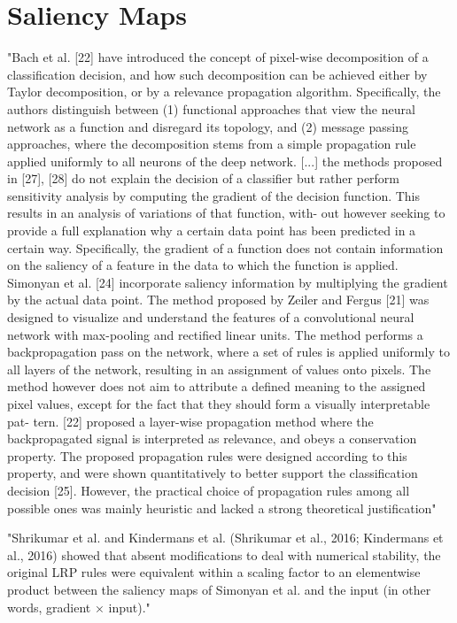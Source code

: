 \documentclass[]{scrartcl}
\begin{document}
\section{Saliency Maps}
"Bach et al. [22] have introduced the concept of pixel-wise decomposition of a classification decision, and how such decomposition can be achieved either by Taylor decomposition, or by a relevance propagation algorithm. Specifically, the authors distinguish between (1) functional approaches that view the neural network as a function and disregard its topology, and (2) message passing approaches, where the decomposition stems from a simple propagation rule applied uniformly to all neurons of the deep network.
[...]
the methods proposed in [27], [28] do not explain the decision of a classifier but rather perform sensitivity analysis by computing the gradient of the decision function. This results in an analysis of variations of that function, with- out however seeking to provide a full explanation why a certain data point has been predicted in a certain way. Specifically, the gradient of a function does not contain information on the saliency of a feature in the data to which the function is applied. Simonyan et al. [24] incorporate saliency information by multiplying the gradient by the actual data point.
The method proposed by Zeiler and Fergus [21] was designed to visualize and understand the features of a convolutional neural network with max-pooling and rectified linear units. The method performs a backpropagation pass on the network, where a set of rules is applied uniformly to all layers of the network, resulting in an assignment of values onto pixels. The method however does not aim to attribute a defined meaning to the assigned pixel values, except for the fact that they should form a visually interpretable pat- tern. [22] proposed a layer-wise propagation method where the backpropagated signal is interpreted as relevance, and obeys a conservation property. The proposed propagation rules were designed according to this property, and were shown quantitatively to better support the classification decision [25]. However, the practical choice of propagation rules among all possible ones was mainly heuristic and lacked a strong theoretical justification" \cite{Montavon2017}

"Shrikumar et al. and Kindermans et al. (Shrikumar et al., 2016; Kindermans et al., 2016) showed that absent modifications to deal with numerical stability, the original LRP rules were equivalent within a scaling factor to an elementwise product between the saliency maps of Simonyan et al. and the input (in other words, gradient × input)." \cite{Shrikumar2017}
\end{document}
